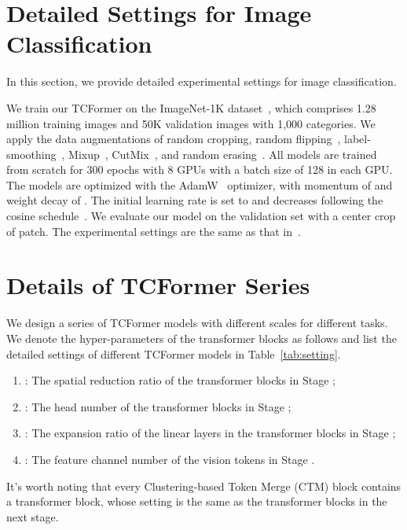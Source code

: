 \documentclass[10pt,twocolumn,letterpaper]{article}
\begin{document}
\section{Detailed Settings for Image Classification}
In this section, we provide detailed experimental settings for image classification.

We train our TCFormer on the ImageNet-1K dataset~\cite{russakovsky2015imagenet}, which comprises 1.28 million training images and 50K validation images with 1,000 categories. 
We apply the data augmentations of random cropping, random flipping~\cite{szegedy2015going}, label-smoothing~\cite{szegedy2016rethinking}, Mixup~\cite{zhang2017mixup}, CutMix~\cite{yun2019cutmix}, and random erasing~\cite{zhong2020random}. 
All models are trained from scratch for 300 epochs with 8 GPUs with a batch size of 128 in each GPU.
The models are optimized with the AdamW~\cite{loshchilov2017decoupled} optimizer, with momentum of  and weight decay of . The initial learning rate is set to   and decreases following the cosine schedule~\cite{loshchilov2016sgdr}. We evaluate our model on the validation set with a center crop of  patch. The experimental settings are the same as that in~\cite{pvt}.



\section{Details of TCFormer Series}
We design a series of TCFormer models with different scales for different tasks. We denote the hyper-parameters of the transformer blocks as follows and list the detailed settings of different TCFormer models in Table~\ref{tab:setting}.
 \begin{enumerate}
	\item[] : The spatial reduction ratio of the transformer blocks in Stage ;
	\item[] : The head number of the transformer blocks in Stage ;
	\item[] : The expansion ratio of the linear layers in the transformer blocks in Stage ;
	\item[] : The feature channel number of the vision tokens in Stage .
\end{enumerate}

It's worth noting that every Clustering-based Token Merge (CTM) block contains a transformer block, whose setting is the same as the transformer blocks in the next stage.
\end{document}
